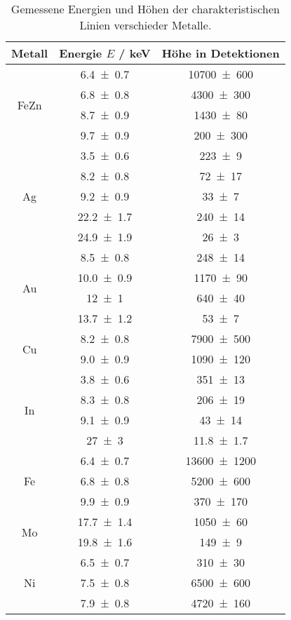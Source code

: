 
\begin{table}[H]
    \centering
    \caption{Gemessene Energien und Höhen der charakteristischen Linien verschieder Metalle.}
    \label{tab:energien-charakeristische-linien}
    \begin{tabular}{c|c|c}
        Metall & Energie $E$ / \unit{\kilo\electronvolt} & Höhe in Detektionen \\\hline\multirow{4}{*}{FeZn} & \num{6.4\pm 0.7} & \num{10700\pm 600} \\ & \num{6.8\pm 0.8} & \num{4300\pm 300} \\ & \num{8.7\pm 0.9} & \num{1430\pm 80} \\ & \num{9.7\pm 0.9} & \num{200\pm 300} \\\hline
\multirow{5}{*}{Ag} & \num{3.5\pm 0.6} & \num{223\pm 9} \\ & \num{8.2\pm 0.8} & \num{72\pm 17} \\ & \num{9.2\pm 0.9} & \num{33\pm 7} \\ & \num{22.2\pm 1.7} & \num{240\pm 14} \\ & \num{24.9\pm 1.9} & \num{26\pm 3} \\\hline
\multirow{4}{*}{Au} & \num{8.5\pm 0.8} & \num{248\pm 14} \\ & \num{10.0\pm 0.9} & \num{1170\pm 90} \\ & \num{12\pm 1} & \num{640\pm 40} \\ & \num{13.7\pm 1.2} & \num{53\pm 7} \\\hline
\multirow{2}{*}{Cu} & \num{8.2\pm 0.8} & \num{7900\pm 500} \\ & \num{9.0\pm 0.9} & \num{1090\pm 120} \\\hline
\multirow{4}{*}{In} & \num{3.8\pm 0.6} & \num{351\pm 13} \\ & \num{8.3\pm 0.8} & \num{206\pm 19} \\ & \num{9.1\pm 0.9} & \num{43\pm 14} \\ & \num{27\pm 3} & \num{11.8\pm 1.7} \\\hline
\multirow{3}{*}{Fe} & \num{6.4\pm 0.7} & \num{13600\pm 1200} \\ & \num{6.8\pm 0.8} & \num{5200\pm 600} \\ & \num{9.9\pm 0.9} & \num{370\pm 170} \\\hline
\multirow{2}{*}{Mo} & \num{17.7\pm 1.4} & \num{1050\pm 60} \\ & \num{19.8\pm 1.6} & \num{149\pm 9} \\\hline
\multirow{3}{*}{Ni} & \num{6.5\pm 0.7} & \num{310\pm 30} \\ & \num{7.5\pm 0.8} & \num{6500\pm 600} \\ & \num{7.9\pm 0.8} & \num{4720\pm 160} \\\hline

\end{tabular}
\end{table}
